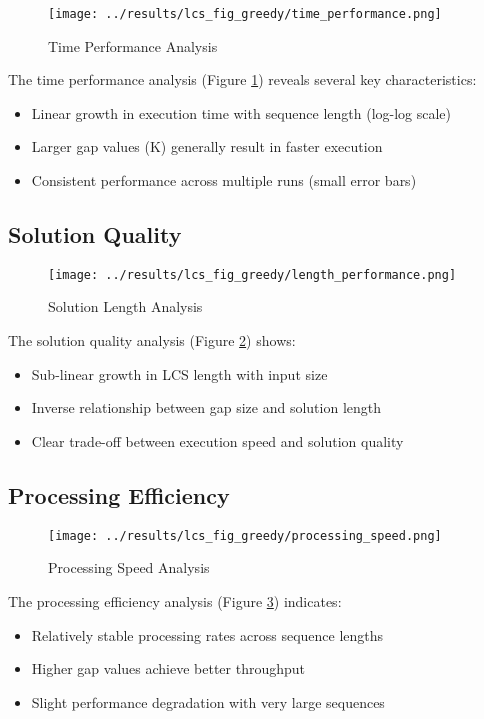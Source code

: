 \documentclass[11pt,a4paper]{article}
\begin{document}
\begin{figure}[H]
    \centering
    \texttt{[image: ../results/lcs\_fig\_greedy/time\_performance.png]}
    \caption{Time Performance Analysis}
    \label{fig:time_performance}
\end{figure}

The time performance analysis (Figure \ref{fig:time_performance}) reveals several key characteristics:
\begin{itemize}
    \item Linear growth in execution time with sequence length (log-log scale)
    \item Larger gap values (K) generally result in faster execution
    \item Consistent performance across multiple runs (small error bars)
\end{itemize}

\subsection{Solution Quality}

\begin{figure}[H]
    \centering
    \texttt{[image: ../results/lcs\_fig\_greedy/length\_performance.png]}
    \caption{Solution Length Analysis}
    \label{fig:length_performance}
\end{figure}

The solution quality analysis (Figure \ref{fig:length_performance}) shows:
\begin{itemize}
    \item Sub-linear growth in LCS length with input size
    \item Inverse relationship between gap size and solution length
    \item Clear trade-off between execution speed and solution quality
\end{itemize}

\subsection{Processing Efficiency}

\begin{figure}[H]
    \centering
    \texttt{[image: ../results/lcs\_fig\_greedy/processing\_speed.png]}
    \caption{Processing Speed Analysis}
    \label{fig:processing_speed}
\end{figure}

The processing efficiency analysis (Figure \ref{fig:processing_speed}) indicates:
\begin{itemize}
    \item Relatively stable processing rates across sequence lengths
    \item Higher gap values achieve better throughput
    \item Slight performance degradation with very large sequences
\end{itemize}
\end{document}
